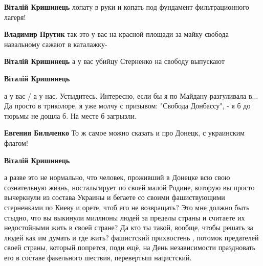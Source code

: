 \begin{itemize}
\begin{itemize}
\textbf{Віталій Кришинець} лопату в руки и копать под фундамент фильтрационного лагеря!

 
\textbf{Владимир Прутик} так это у вас на красной площади за майку свобода навальному сажают в каталажку-

 
\textbf{Віталій Кришинець} а у вас убийцу Стерненко на свободу выпускают

 
\textbf{Віталій Кришинець} 

а у вас / а у нас. Устыдитесь. Интересно, если бы я по Майдану разгуливала в...
Да просто в триколоре, я уже молчу с призывом: "Свобода Донбассу", - я б до
тюрьмы не дошла б. На месте б загрызли.


 
\textbf{Евгения Бильченко}
То ж самое можно сказать и про Донецк, с украинским флагом!

 
\textbf{Віталій Кришинець} 

а разве это не нормально, что человек, проживший в Донецке всю свою
сознательную жизнь, ностальгирует по своей малой Родине, которую вы просто
вычеркнули из состава Украины и бегаете со своими фашиствующими стерненками по
Киеву и орете, чтоб его не возвращать? Это мне должно быть стыдно, что вы
выкинули миллионы людей за пределы страны и считаете их недостойными жить в
своей стране? Да кто ты такой, вообще, чтобы решать за людей как им думать и
где жить? фашистский прихвостень , потомок предателей своей страны, который
попрется, поди ещё, на День независимости праздновать его в составе факельного
шествия, перевертыш нацистский.



\end{itemize}
\end{itemize}
